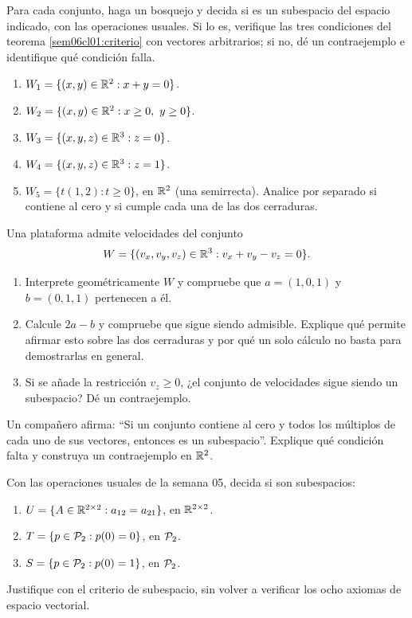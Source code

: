 \documentclass[compacto,10pt]{pubciencias-notas}
\begin{document}
\begin{ejer}
    Para cada conjunto, haga un bosquejo y decida si es un subespacio del
    espacio indicado, con las operaciones usuales. Si lo es, verifique
    las tres condiciones del teorema \ref{sem06cl01:criterio} con vectores
    arbitrarios; si no, dé un contraejemplo e identifique qué condición falla.
    \begin{enumerate}
        \item $W_1=\{(x,y)\in\R^2:x+y=0\}$.
        \item $W_2=\{(x,y)\in\R^2:x\ge0,\ y\ge0\}$.
        \item $W_3=\{(x,y,z)\in\R^3:z=0\}$.
        \item $W_4=\{(x,y,z)\in\R^3:z=1\}$.
        \item $W_5=\{t(1,2):t\ge0\}$, en $\R^2$ (una semirrecta).
              Analice por separado si contiene al cero y si cumple cada
              una de las dos cerraduras.
    \end{enumerate}
\end{ejer}

\begin{ejer}
    Una plataforma admite velocidades del conjunto
    \[
        W=\{(v_x,v_y,v_z)\in\R^3:v_x+v_y-v_z=0\}.
    \]
    \begin{enumerate}
        \item Interprete geométricamente $W$ y compruebe que
              $a=(1,0,1)$ y $b=(0,1,1)$ pertenecen a él.
        \item Calcule $2a-b$ y compruebe que sigue siendo admisible.
              Explique qué permite afirmar esto sobre las dos cerraduras
              y por qué un solo cálculo no basta para demostrarlas en general.
        \item Si se añade la restricción $v_z\ge0$, ¿el conjunto de
              velocidades sigue siendo un subespacio? Dé un contraejemplo.
    \end{enumerate}
\end{ejer}



\begin{ejer}
    Un compañero afirma: ``Si un conjunto contiene al cero y todos los
    múltiplos de cada uno de sus vectores, entonces es un subespacio''.
    Explique qué condición falta y construya un contraejemplo en $\R^2$.
\end{ejer}

\begin{ejer}
    Con las operaciones usuales de la semana 05, decida si son subespacios:
    \begin{enumerate}
        \item $U=\{A\in\Mat[\R]{2}{2}:a_{12}=a_{21}\}$, en
              $\Mat[\R]{2}{2}$.
        \item $T=\{p\in\Pol_2:p(0)=0\}$, en $\Pol_2$.
        \item $S=\{p\in\Pol_2:p(0)=1\}$, en $\Pol_2$.
    \end{enumerate}
    Justifique con el criterio de subespacio, sin volver a verificar los
    ocho axiomas de espacio vectorial.
\end{ejer}
\end{document}
